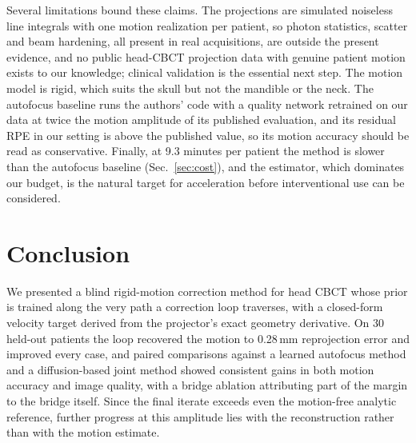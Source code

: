 \documentclass[11pt]{article}
\begin{document}
Several limitations bound these claims. The projections are simulated noiseless line
integrals with one motion realization per patient, so photon statistics, scatter and beam
hardening, all present in real acquisitions, are outside the present evidence, and no public head-CBCT projection data
with genuine patient motion exists to our knowledge; clinical validation is the essential
next step. The motion model is rigid, which suits the skull but not the mandible or the
neck. The autofocus baseline runs the authors' code with a quality network retrained on our
data at twice the motion amplitude of its published evaluation, and its residual RPE in our
setting is above the published value, so its motion accuracy should be read as
conservative. Finally, at 9.3 minutes per patient the
method is slower than the autofocus baseline (Sec.~\ref{sec:cost}), and the estimator, which dominates our budget, is
the natural target for acceleration before interventional use can be considered.

\section{Conclusion}
\label{sec:conclusion}

We presented a blind rigid-motion correction method for head CBCT whose prior is trained
along the very path a correction loop traverses, with a closed-form velocity target
derived from the projector's exact geometry derivative. On 30 held-out patients the loop
recovered the motion to 0.28\,mm reprojection error and improved every case, and paired
comparisons against a learned autofocus method and a diffusion-based joint method showed
consistent gains in both motion accuracy and image quality, with a bridge ablation
attributing part of the margin to the bridge itself.
Since the final iterate exceeds even the motion-free analytic reference, further progress
at this amplitude lies with the reconstruction rather than with the motion estimate.
\end{document}
